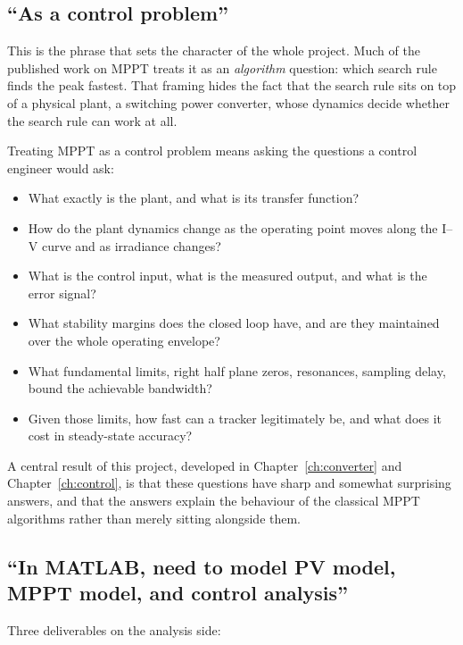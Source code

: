 \subsection{``As a control problem''}

This is the phrase that sets the character of the whole project. Much of the
published work on MPPT treats it as an \emph{algorithm} question: which search
rule finds the peak fastest. That framing hides the fact that the search rule
sits on top of a physical plant, a switching power converter, whose dynamics
decide whether the search rule can work at all.

Treating MPPT as a control problem means asking the questions a control engineer
would ask:

\begin{itemize}[leftmargin=1.4em]
  \item What exactly is the plant, and what is its transfer function?
  \item How do the plant dynamics change as the operating point moves along the
        I--V curve and as irradiance changes?
  \item What is the control input, what is the measured output, and what is the
        error signal?
  \item What stability margins does the closed loop have, and are they
        maintained over the whole operating envelope?
  \item What fundamental limits, right half plane zeros, resonances, sampling
        delay, bound the achievable bandwidth?
  \item Given those limits, how fast can a tracker legitimately be, and what
        does it cost in steady-state accuracy?
\end{itemize}

A central result of this project, developed in
Chapter~\ref{ch:converter} and Chapter~\ref{ch:control}, is that these questions
have sharp and somewhat surprising answers, and that the answers explain the
behaviour of the classical MPPT algorithms rather than merely sitting alongside
them.

\subsection{``In MATLAB, need to model PV model, MPPT model, and control analysis''}

Three deliverables on the analysis side:

